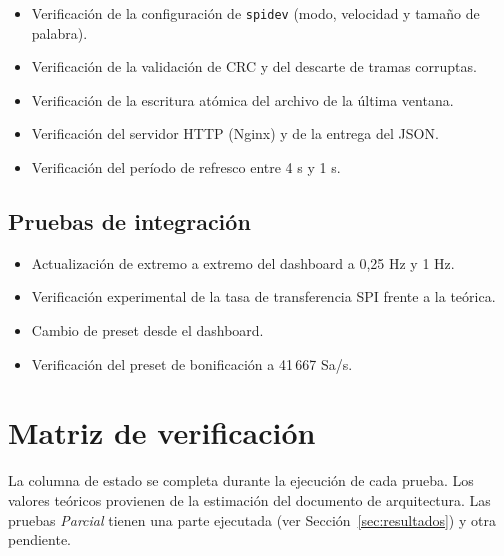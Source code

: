 \documentclass[12pt,a4paper]{article}
\begin{document}
\begin{itemize}
  \item Verificación de la configuración de \texttt{spidev} (modo, velocidad y tamaño de palabra).
  \item Verificación de la validación de CRC y del descarte de tramas corruptas.
  \item Verificación de la escritura atómica del archivo de la última ventana.
  \item Verificación del servidor HTTP (Nginx) y de la entrega del JSON.
  \item Verificación del período de refresco entre 4 s y 1 s.
\end{itemize}

\subsection{Pruebas de integración}

\begin{itemize}
  \item Actualización de extremo a extremo del dashboard a 0{,}25 Hz y 1 Hz.
  \item Verificación experimental de la tasa de transferencia SPI frente a la teórica.
  \item Cambio de preset desde el dashboard.
  \item Verificación del preset de bonificación a 41\,667 Sa/s.
\end{itemize}

\section{Matriz de verificación}

La columna de estado se completa durante la ejecución de cada prueba. Los valores teóricos provienen de la estimación del documento de arquitectura. Las pruebas \emph{Parcial} tienen una parte ejecutada (ver Sección~\ref{sec:resultados}) y otra pendiente.
\end{document}
